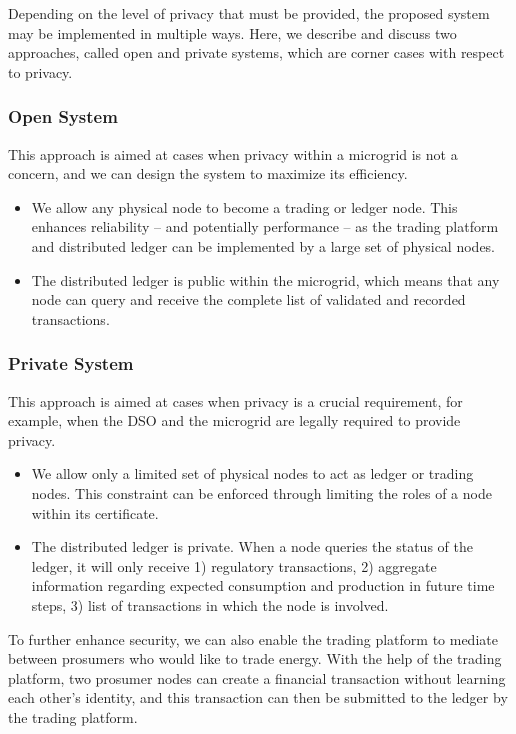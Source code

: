 \documentclass[chi_draft]{sigchi}
\begin{document}
Depending on the level of privacy that must be provided, the proposed system may be implemented in multiple ways.
Here, we describe and discuss two approaches, called open and private systems, which are corner cases with respect to privacy.

\subsubsection{Open System}
This approach is aimed at cases when privacy within a microgrid is not a concern, and we can design the system to maximize its efficiency.
\begin{itemize}
\item We allow any physical node to become a trading or ledger node. This enhances reliability -- and potentially performance -- as the trading platform and distributed ledger can be implemented by a large set of physical nodes.
\item The distributed ledger is public within the microgrid, which means that any node can query and receive the complete list of validated and recorded transactions.
\end{itemize}

\subsubsection{Private System}
This approach is aimed at cases when privacy is a crucial requirement, for example, when the DSO and the microgrid are legally required to provide privacy.
\begin{itemize}
\item We allow only a limited set of physical nodes to act as ledger or trading nodes. This constraint can be enforced through limiting the roles of a node within its certificate.
\item The distributed ledger is private. When a node queries the status of the ledger, it will only receive 1) regulatory transactions, 2) aggregate information regarding expected consumption and production in future time steps, 3) list of transactions in which the node is involved.
\end{itemize}
To further enhance security, we can also enable the trading platform to mediate between prosumers who would like to trade energy. With the help of the trading platform, two prosumer nodes can create a financial transaction without learning each other's identity, and this transaction can then be submitted to the ledger by the trading platform.
\end{document}

